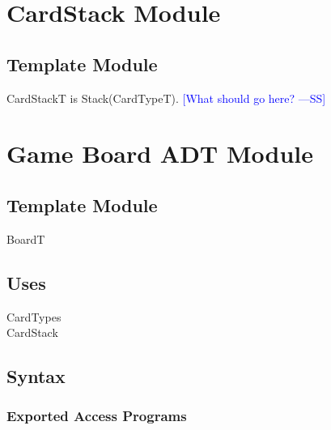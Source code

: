 \documentclass[12pt]{article}
\newcommand{\authornote}[3]{\textcolor{#1}{[#3 ---#2]}}
\newcommand{\authornote}[3]{}
\newcommand{\wss}[1]{\authornote{blue}{SS}{#1}}
\begin{document}
\newpage

\section* {CardStack Module}

\subsection* {Template Module}

CardStackT is Stack(CardTypeT). 
\wss{What should go here?}

\newpage

\section* {Game Board ADT Module}

\subsection*{Template Module}

BoardT

\subsection* {Uses}

\noindent CardTypes\\
\noindent CardStack

\subsection* {Syntax}

\subsubsection* {Exported Access Programs}
\end{document}
